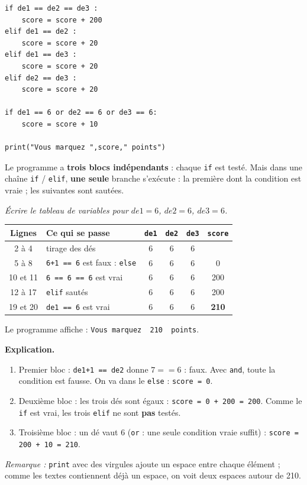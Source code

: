 \documentclass[addpoints, 11pt]{exam}
\newcommand{\enonce}[1]{\textit{#1}\par\smallskip}
\newcommand{\explication}{\par\smallskip\noindent\textbf{Explication.}\ }
\newcommand{\code}[1]{\texttt{#1}}
\DeclareRobustCommand{\_}{\textunderscore\allowbreak}
\begin{document}
\begin{questions}
\begin{lstlisting}
if de1 == de2 == de3 :
    score = score + 200
elif de1 == de2 :
    score = score + 20
elif de1 == de3 :
    score = score + 20
elif de2 == de3 :
    score = score + 20

if de1 == 6 or de2 == 6 or de3 == 6:
    score = score + 10

print("Vous marquez ",score," points")
\end{lstlisting}

\begin{astuce}[À retenir : \code{if} et \code{elif}]
Le programme a \textbf{trois blocs indépendants} : chaque \code{if} est testé. Mais dans une chaîne \code{if} / \code{elif}, \textbf{une seule} branche s'exécute : la première dont la condition est vraie ; les suivantes sont sautées.
\end{astuce}

\question[2] \enonce{Écrire le tableau de variables pour $de1 = 6$, $de2 = 6$, $de3 = 6$.}
\begin{reponse}
\begin{center}
\begin{tabular}{|c|l|c|c|c|c|}
\hline
Lignes & Ce qui se passe & \code{de1} & \code{de2} & \code{de3} & \code{score} \\ \hline
2 à 4 & tirage des dés & 6 & 6 & 6 & \\
5 à 8 & \code{6+1 == 6} est faux : \code{else} & 6 & 6 & 6 & 0 \\
10 et 11 & \code{6 == 6 == 6} est vrai & 6 & 6 & 6 & 200 \\
12 à 17 & \code{elif} sautés & 6 & 6 & 6 & 200 \\
19 et 20 & \code{de1 == 6} est vrai & 6 & 6 & 6 & \textbf{210} \\ \hline
\end{tabular}
\end{center}
Le programme affiche : \code{Vous marquez \ 210 \ points}.
\end{reponse}
\explication
\begin{enumerate}
  \item Premier bloc : \code{de1+1 == de2} donne $7 == 6$ : faux. Avec \code{and}, toute la condition est fausse. On va dans le \code{else} : \code{score = 0}.
  \item Deuxième bloc : les trois dés sont égaux : \code{score = 0 + 200 = 200}. Comme le \code{if} est vrai, les trois \code{elif} ne sont \textbf{pas} testés.
  \item Troisième bloc : un dé vaut 6 (\code{or} : une seule condition vraie suffit) : \code{score = 200 + 10 = 210}.
\end{enumerate}
\textit{Remarque :} \code{print} avec des virgules ajoute un espace entre chaque élément ; comme les textes contiennent déjà un espace, on voit deux espaces autour de 210.


\end{questions}
\end{document}
